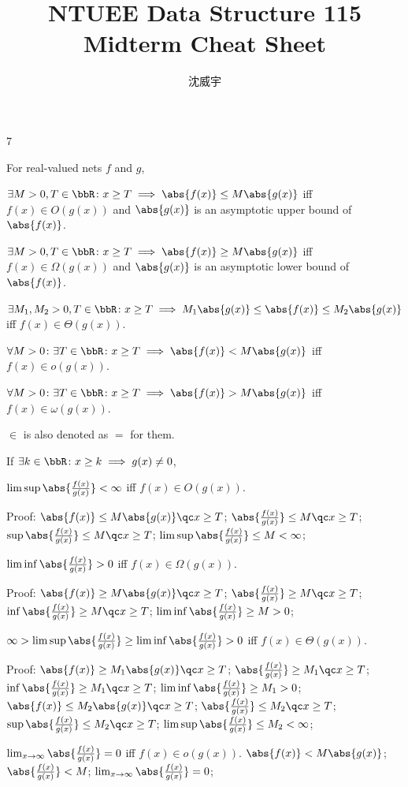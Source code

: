 \documentclass[a4paper,10pt]{extarticle}
\title{NTUEE Data Structure 115 Midterm Cheat Sheet}
\author{沈威宇}
\date{\temtoday}
\begin{document}
\temdoc
\fontsize{5pt}{6pt}\selectfont
\begin{multicols}{7}


For real-valued nets $f$ and $g$,

$\exists M>0,T\in\bbR\colon x\ge T\implies\abs{f(x)}\le M\abs{g(x)}$ iff $f(x)\in O(g(x))$ and $\abs{g(x)}$ is an asymptotic upper bound of $\abs{f(x)}$.

$\exists M>0,T\in\bbR\colon x\ge T\implies\abs{f(x)}\ge M\abs{g(x)}$ iff $f(x)\in \Omega(g(x))$ and $\abs{g(x)}$ is an asymptotic lower bound of $\abs{f(x)}$.

$\exists M_1,M_2>0,T\in\bbR\colon x\ge T\implies M_1\abs{g(x)}\le\abs{f(x)}\le M_2\abs{g(x)}$ iff $f(x)\in \Theta(g(x))$.

$\forall M>0\colon\exists T\in\bbR\colon x\ge T\implies\abs{f(x)}<M\abs{g(x)}$ iff $f(x)\in o(g(x))$.

$\forall M>0\colon\exists T\in\bbR\colon x\ge T\implies\abs{f(x)}>M\abs{g(x)}$ iff $f(x)\in \omega(g(x))$.

$\in$ is also denoted as $=$ for them.


If $\exists k\in\bbR\colon x\ge k\implies g(x)\ne0$,

$\limsup\abs{\frac{f(x)}{g(x)}}<\infty$ iff $f(x)\in O(g(x))$.

Proof:
\(\abs{f(x)}\le M\abs{g(x)}\qc x\ge T\); 
\(\abs{\frac{f(x)}{g(x)}}\le M\qc x\ge T\); 
\(\sup\abs{\frac{f(x)}{g(x)}}\le M\qc x\ge T\); 
\(\limsup\abs{\frac{f(x)}{g(x)}}\le M<\infty\); 


$\liminf\abs{\frac{f(x)}{g(x)}}>0$ iff $f(x)\in \Omega(g(x))$.

Proof:
\(\abs{f(x)}\ge M\abs{g(x)}\qc x\ge T\); 
\(\abs{\frac{f(x)}{g(x)}}\ge M\qc x\ge T\); 
\(\inf\abs{\frac{f(x)}{g(x)}}\ge M\qc x\ge T\); 
\(\liminf\abs{\frac{f(x)}{g(x)}}\ge M>0\); 


$\infty>\limsup\abs{\frac{f(x)}{g(x)}}\ge\liminf\abs{\frac{f(x)}{g(x)}}>0$ iff $f(x)\in \Theta(g(x))$.

Proof:
\(\abs{f(x)}\ge M_1\abs{g(x)}\qc x\ge T\); 
\(\abs{\frac{f(x)}{g(x)}}\ge M_1\qc x\ge T\); 
\(\inf\abs{\frac{f(x)}{g(x)}}\ge M_1\qc x\ge T\); 
\(\liminf\abs{\frac{f(x)}{g(x)}}\ge M_1>0\); 
\(\abs{f(x)}\le M_2\abs{g(x)}\qc x\ge T\); 
\(\abs{\frac{f(x)}{g(x)}}\le M_2\qc x\ge T\); 
\(\sup\abs{\frac{f(x)}{g(x)}}\le M_2\qc x\ge T\); 
\(\limsup\abs{\frac{f(x)}{g(x)}}\le M_2<\infty\); 


$\lim_{x\to\infty}\abs{\frac{f(x)}{g(x)}}=0$ iff $f(x)\in o(g(x))$.
\(\abs{f(x)}<M\abs{g(x)}\); 
\(\abs{\frac{f(x)}{g(x)}}<M\); 
\(\lim_{x\to\infty}\abs{\frac{f(x)}{g(x)}}=0\); 


\end{multicols}
\end{document}
